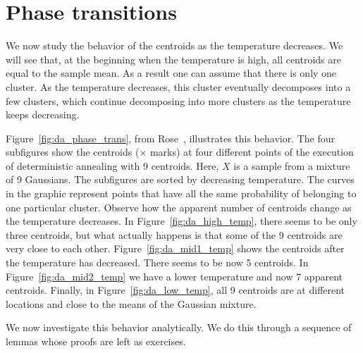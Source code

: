 \section{Phase transitions}
\label{sec:phase_transition}

We now study the behavior of the centroids as the temperature decreases.
We will see that, at the beginning when the temperature is high, all centroids
are equal to the sample mean. As a result one can assume that there
is only one cluster. As the temperature decreases, this cluster eventually decomposes into a few clusters, which continue decomposing into more clusters as the temperature keeps decreasing.

Figure~\ref{fig:da_phase_trans}, from Rose~\cite{rose1998deterministic}, illustrates this behavior. The four subfigures show the centroids ($\times$ marks) at four different points of the execution of
deterministic annealing with 9 centroids. Here, $X$ is a sample from a mixture of 9 Gaussians.
The subfigures are sorted by decreasing temperature. The curves in the graphic represent points that have all the same probability of belonging to one particular cluster. Observe how the apparent number of centroids change as the temperature
decreases. In Figure~\ref{fig:da_high_temp}, there seems to be only three centroids,
but what actually happens is that some of the 9 centroids are very close to
each other. Figure~\ref{fig:da_mid1_temp} shows the centroids after the temperature has decreased.
There seems to be now 5 centroids. In Figure~\ref{fig:da_mid2_temp} we have a lower
temperature and now 7 apparent centroids. Finally, in Figure~\ref{fig:da_low_temp}, all 9
centroids are at different locations and close to the means of the Gaussian
mixture.

We now investigate this behavior analytically. We do this through a
sequence of lemmas whose proofs are left as exercises.


